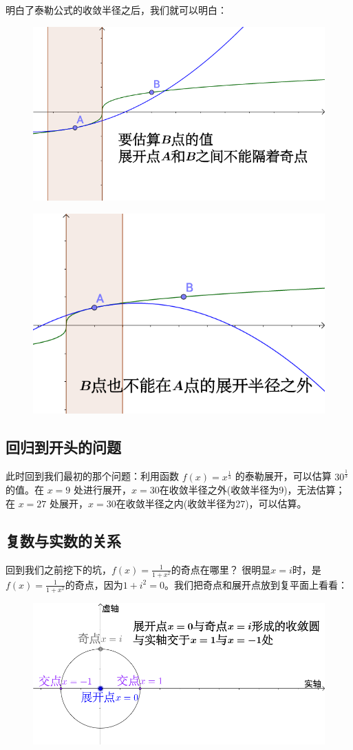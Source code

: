 \documentclass[12pt]{article}
\begin{document}
明白了泰勒公式的收敛半径之后，我们就可以明白：
\begin{figure}[H]
  \centering
  \includegraphics[width=.8\textwidth]{fig/TaylorExpansion_9.png} 
\end{figure}
\begin{figure}[H]
  \centering
  \includegraphics[width=.8\textwidth]{fig/TaylorExpansion_10.png} 
\end{figure}

\subsection{回归到开头的问题}
此时回到我们最初的那个问题：利用函数 $f(x) = x^{\frac{1}{3}}$ 的泰勒展开，可以估算 $30^\frac{1}{3}$ 的值。在 $x = 9$ 处进行展开，$x=30$在收敛半径之外(收敛半径为9)，无法估算；在 $x=27$ 处展开，$x=30$在收敛半径之内(收敛半径为27)，可以估算。

\subsection{复数与实数的关系}
回到我们之前挖下的坑，$f(x)=\frac{1}{1+x^2}$的奇点在哪里？
很明显$x=i$时，是$f(x)=\frac{1}{1+x^2}$的奇点，因为$1+i^2=0$。我们把奇点和展开点放到复平面上看看：
\begin{figure}[H]
  \centering
  \includegraphics[width=.8\textwidth]{fig/TaylorExpansion_11.png} 
\end{figure}
\end{document}
